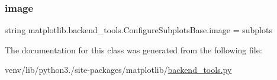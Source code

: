 \mbox{\label{classmatplotlib_1_1backend__tools_1_1ConfigureSubplotsBase_a12c9fa8b50a8b5bc9b95532b155ce0d3}} 
\subsubsection{\texorpdfstring{image}{image}}
{\footnotesize\ttfamily string matplotlib.\+backend\+\_\+tools.\+Configure\+Subplots\+Base.\+image = \textquotesingle{}subplots\textquotesingle{}\hspace{0.3cm}{\ttfamily [static]}}



The documentation for this class was generated from the following file\+:\begin{DoxyCompactItemize}
\item 
venv/lib/python3./site-\/packages/matplotlib/\hyperlink{backend__tools_8py}{backend\+\_\+tools.\+py}\end{DoxyCompactItemize}
